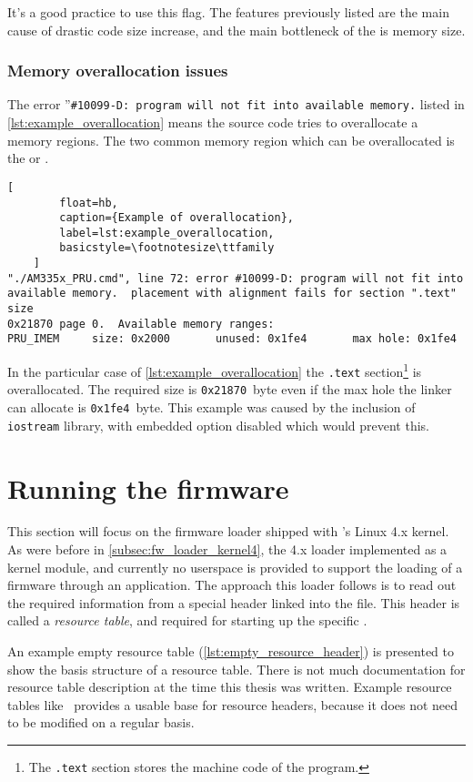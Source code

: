 It's a good practice to use this flag. The features previously listed are the main cause of drastic code size increase, and the main bottleneck of the \pru{} is memory size.

\subsubsection{Memory overallocation issues}

The error ''\verb|#10099-D: program will not fit into available memory.| listed in \cref{lst:example_overallocation} means the source code tries to overallocate a memory regions. The two common memory region which can be overallocated is the \iram{} or \dram{}.

\begin{lstlisting}[
		float=hb,
		caption={Example of overallocation},
		label=lst:example_overallocation,
		basicstyle=\footnotesize\ttfamily
	]
"./AM335x_PRU.cmd", line 72: error #10099-D: program will not fit into
available memory.  placement with alignment fails for section ".text" size
0x21870 page 0.  Available memory ranges:
PRU_IMEM     size: 0x2000       unused: 0x1fe4       max hole: 0x1fe4
\end{lstlisting}

In the particular case of \cref{lst:example_overallocation} the \verb|.text| section\footnote{The \verb|.text| section stores the machine code of the program.} is overallocated. The required size is \verb|0x21870|\ byte even if the max hole the linker can allocate is \verb|0x1fe4|\ byte. This example was caused by the inclusion of \verb|iostream| library, with embedded \cpp{} option disabled which would prevent this.

\section{Running the firmware}

This section will focus on the firmware loader shipped with \ti{}'s Linux 4.x kernel. As were before in \cref{subsec:fw_loader_kernel4}, the 4.x loader implemented as a kernel module, and currently no userspace \api{} is provided to support the loading of a \pru{} firmware through an application. The approach this loader follows is to read out the required information from a special header linked into the \elf{} file. This header is called a \emph{resource table}, and required for starting up the specific \pru{}.

An example empty resource table (\cref{lst:empty_resource_header}) is presented to show the basis structure of a resource table. There is not much documentation for resource table description at the time this thesis was written. Example resource tables like~\cite{RESOURCE_TABLE_0}\cite{RESOURCE_TABLE_1} provides a usable base for resource headers, because it does not need to be modified on a regular basis.


